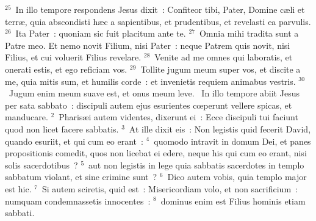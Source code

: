 ${}^{25}$~In illo tempore respondens Jesus dixit~: Confiteor tibi, Pater, Domine c\ae li et terr\ae , quia abscondisti h\ae c a sapientibus, et prudentibus, et revelasti ea parvulis.
${}^{26}$~Ita Pater~: quoniam sic fuit placitum ante te.
${}^{27}$~Omnia mihi tradita sunt a Patre meo. Et nemo novit Filium, nisi Pater~: neque Patrem quis novit, nisi Filius, et cui voluerit Filius revelare.
${}^{28}$~Venite ad me omnes qui laboratis, et onerati estis, et ego reficiam vos.
${}^{29}$~Tollite jugum meum super vos, et discite a me, quia mitis sum, et humilis corde~: et invenietis requiem animabus vestris.
${}^{30}$~Jugum enim meum suave est, et onus meum leve.
~In illo tempore abiit Jesus per sata sabbato~: discipuli autem ejus esurientes cœperunt vellere spicas, et manducare.
${}^{2}$~Pharis\ae i autem videntes, dixerunt ei~: Ecce discipuli tui faciunt quod non licet facere sabbatis.
${}^{3}$~At ille dixit eis~: Non legistis quid fecerit David, quando esuriit, et qui cum eo erant~:
${}^{4}$~quomodo intravit in domum Dei, et panes propositionis comedit, quos non licebat ei edere, neque his qui cum eo erant, nisi solis sacerdotibus~?
${}^{5}$~aut non legistis in lege quia sabbatis sacerdotes in templo sabbatum violant, et sine crimine sunt~?
${}^{6}$~Dico autem vobis, quia templo major est hic.
${}^{7}$~Si autem sciretis, quid est~: Misericordiam volo, et non sacrificium~: numquam condemnassetis innocentes~:
${}^{8}$~dominus enim est Filius hominis etiam sabbati.


